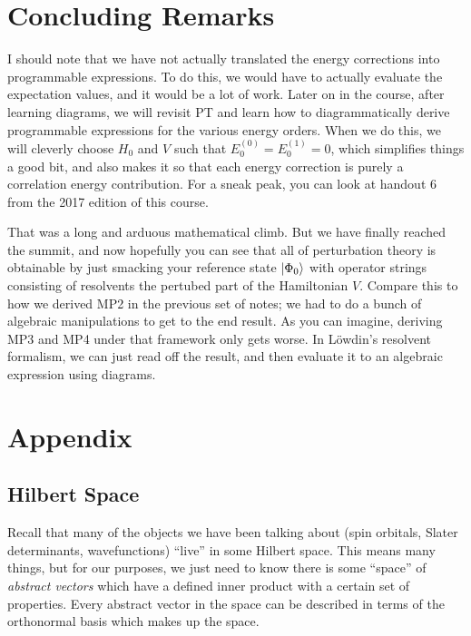 \documentclass{article}
\begin{document}
\section{Concluding Remarks}
I should note that we have not actually translated the energy corrections into 
programmable expressions. 
To do this, we would have to actually evaluate the expectation values, and it would 
be a lot of work.
Later on in the course, after learning diagrams, we will revisit PT and learn 
how to diagrammatically derive programmable expressions for the various energy orders.
When we do this, we will cleverly choose $H_0$ and $V$ such that $E_0^{(0)} = E_0^{(1)} = 0$,
which simplifies things a good bit, and also makes it so that each energy
correction is purely a correlation energy contribution. 
For a sneak peak, you can look at handout 6 from the 2017 edition of this course.


That was a long and arduous mathematical climb. But we have finally reached the summit,
and now hopefully you can see that all of perturbation theory is obtainable by just 
smacking your reference state $\ket{\Phi_0}$ with operator strings consisting 
of resolvents the pertubed part of the Hamiltonian $V$. 
Compare this to how we derived MP2 in the previous set of notes; we had to do a bunch of 
algebraic manipulations to get to the end result. 
As you can imagine, deriving MP3 and MP4 under that framework only gets worse. 
In L{\"o}wdin's resolvent formalism, we can just read off the result, 
    and then evaluate it to an algebraic expression using diagrams. 

\section{Appendix}
\subsection{Hilbert Space}
Recall that many of the objects we have been talking about (spin orbitals, Slater determinants, wavefunctions)
``live'' in some Hilbert space. This means many things, but for our purposes, we just need to know
there is some ``space'' of \textit{abstract vectors} which have a defined inner product with a certain set of properties.
Every abstract vector in the space can be described in terms of the orthonormal basis which makes up the space. 
\end{document}
